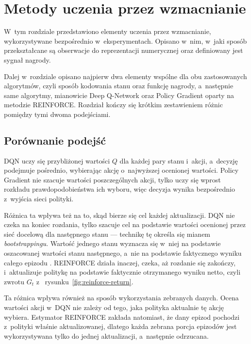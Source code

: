 \chapter{Metody uczenia przez wzmacnianie}
\label{chap:metody-rl}

W~tym rozdziale przedstawiono elementy uczenia przez
wzmacnianie, wykorzystywane bezpośrednio w~eksperymentach.
Opisano w~nim, w~jaki sposób przekształcane są obserwacje do reprezentacji numerycznej
oraz definiowany jest sygnał nagrody.

Dalej w~rozdziale opisano najpierw dwa elementy wspólne dla
obu zastosowanych algorytmów, czyli sposób kodowania stanu oraz
funkcję nagrody, a~następnie same algorytmy, mianowicie Deep Q-Network oraz
Policy Gradient oparty na metodzie REINFORCE. Rozdział kończy się krótkim
zestawieniem różnic pomiędzy tymi dwoma podejściami.






\section{Porównanie podejść}
\label{sec:porownanie-dqn-pg}

DQN uczy się przybliżonej wartości $Q$ dla każdej pary stanu i~akcji,
a~decyzję podejmuje pośrednio, wybierając akcję o~najwyższej ocenionej
wartości. Policy Gradient nie szacuje wartości poszczególnych akcji,
tylko uczy się wprost rozkładu prawdopodobieństwa ich wyboru, więc
decyzja wynika bezpośrednio z~wyjścia sieci polityki.

Różnica ta wpływa też na to, skąd bierze się cel każdej aktualizacji.
DQN nie czeka na koniec rozdania, tylko szacuje cel na podstawie
wartości ocenionej przez sieć docelową dla następnego stanu — technikę
tę określa się mianem \emph{bootstrappingu}.
Wartość jednego stanu wyznacza się w~niej na podstawie oszacowanej
wartości stanu następnego, a~nie na podstawie faktycznego wyniku
całego epizodu \cite{sutton_barto_rl}. REINFORCE działa inaczej, czeka,
aż rozdanie się zakończy, i~aktualizuje politykę na podstawie
faktycznie otrzymanego wyniku netto, czyli zwrotu $G_t$ z~
rysunku~\ref{fig:reinforce-return}.

Ta różnica wpływa również na sposób wykorzystania zebranych danych.
Ocena wartości akcji w~DQN nie zależy od tego, jaka polityka aktualnie
tę akcję wybiera.
Estymator REINFORCE zakłada natomiast, że dany epizod pochodzi
z~polityki właśnie aktualizowanej, dlatego każda zebrana porcja
epizodów jest wykorzystywana tylko do jednej aktualizacji, a~następnie odrzucana.

